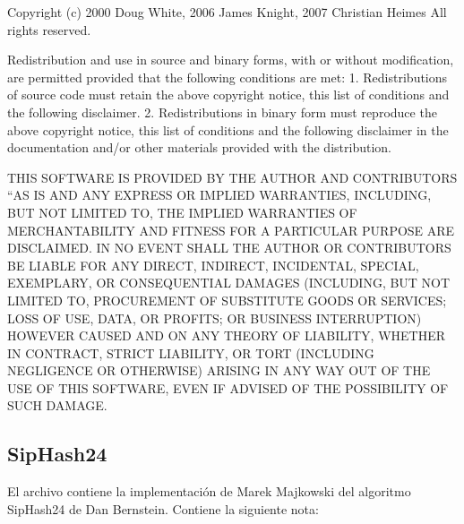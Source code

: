 \documentclass[a4,10pt,spanish]{sphinxmanual}
\begin{document}
\begin{sphinxVerbatim}[commandchars=\\\{\}]
Copyright (c) 2000 Doug White, 2006 James Knight, 2007 Christian Heimes
All rights reserved.

Redistribution and use in source and binary forms, with or without
modification, are permitted provided that the following conditions
are met:
1. Redistributions of source code must retain the above copyright
   notice, this list of conditions and the following disclaimer.
2. Redistributions in binary form must reproduce the above copyright
   notice, this list of conditions and the following disclaimer in the
   documentation and/or other materials provided with the distribution.

THIS SOFTWARE IS PROVIDED BY THE AUTHOR AND CONTRIBUTORS ``AS IS\PYGZsq{}\PYGZsq{} AND
ANY EXPRESS OR IMPLIED WARRANTIES, INCLUDING, BUT NOT LIMITED TO, THE
IMPLIED WARRANTIES OF MERCHANTABILITY AND FITNESS FOR A PARTICULAR PURPOSE
ARE DISCLAIMED.  IN NO EVENT SHALL THE AUTHOR OR CONTRIBUTORS BE LIABLE
FOR ANY DIRECT, INDIRECT, INCIDENTAL, SPECIAL, EXEMPLARY, OR CONSEQUENTIAL
DAMAGES (INCLUDING, BUT NOT LIMITED TO, PROCUREMENT OF SUBSTITUTE GOODS
OR SERVICES; LOSS OF USE, DATA, OR PROFITS; OR BUSINESS INTERRUPTION)
HOWEVER CAUSED AND ON ANY THEORY OF LIABILITY, WHETHER IN CONTRACT, STRICT
LIABILITY, OR TORT (INCLUDING NEGLIGENCE OR OTHERWISE) ARISING IN ANY WAY
OUT OF THE USE OF THIS SOFTWARE, EVEN IF ADVISED OF THE POSSIBILITY OF
SUCH DAMAGE.
\end{sphinxVerbatim}


\subsection{SipHash24}
\label{\detokenize{license:siphash24}}
\sphinxAtStartPar
El archivo  contiene la implementación de Marek Majkowski del algoritmo SipHash24 de Dan Bernstein. Contiene la siguiente nota:
\end{document}
